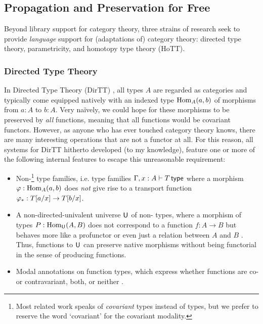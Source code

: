 \documentclass{lmcs} %
\theoremstyle{plain}\newtheorem{satz}[thm]{Satz} %
\theoremstyle{plain}
\theoremstyle{definition}
\begin{document}
\subsection{Propagation and Preservation for Free}
Beyond library support for category theory, three strains of research seek to provide \emph{language} support for (adaptations of) category theory:
directed type theory, parametricity, and homotopy type theory (HoTT).

\subsubsection{Directed Type Theory}
In Directed Type Theory (DirTT) \cite{2dtt,riehl-shulman-dtt,north-dirhott,weaver-licata-dua,dua-simplicial}, all types $A$ are regarded as categories and typically come equipped natively with an indexed type ${\mathrm{Hom}}_A(a, b)$ of morphisms from $a : A$ to $b : A$.
Very na\"ively, we could hope for these morphisms to be preserved by \emph{all} functions, meaning that all functions would be covariant functors.
However, as anyone who has ever touched category theory knows, there are many interesting operations that are not a functor at all.
For this reason, all systems for DirTT hitherto developed (to my knowledge), feature one or more of the following internal features to escape this unreasonable requirement:
\begin{itemize}
	\item Non-\covarfib{}\footnote{Most related work speaks of \emph{covariant} types instead of \covarfib{} types, but we prefer to reserve the word `covariant' for the covariant modality.} type families, i.e. type families $\Gamma, x : A \vdash T \,\mathsf{type}$ where a morphism $\varphi : {\mathrm{Hom}}_A(a, b)$ does \emph{not} give rise to a transport function $\varphi_* : T[a/x] \to T[b/x]$.
	\item A non-directed-univalent universe $\mathsf{U}_{}$ of non-\covarfib{} types, where a morphism of types $P : {\mathrm{Hom}}_{\mathsf{U}_{}}(A, B)$ does not correspond to a function $f : A \to B$ but behaves more like a profunctor or even just a relation between $A$ and $B$ \cite{riehl-shulman-dtt,weaver-licata-dua,dua-simplicial}.
	Thus, functions to $\mathsf{U}_{}$ can preserve native morphisms without being functorial in the sense of producing functions.
	\item Modal annotations on function types, which express whether functions are co- or contravariant, both, or neither \cite{abel-polarized,2dtt,mathesis,north-dirhott,dua-simplicial}.
\end{itemize}
\end{document}
